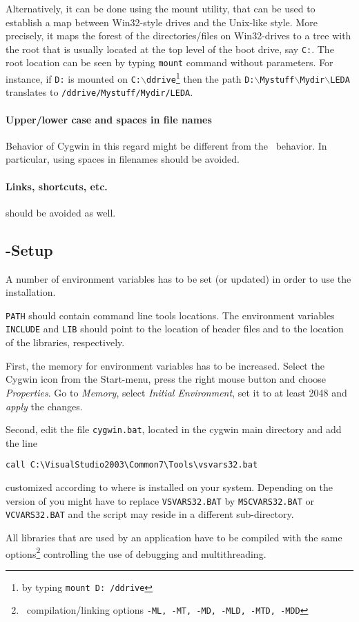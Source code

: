 Alternatively, it can be done using the mount utility, that can be
used to establish a map between Win32-style drives and the Unix-like
style. More precisely, it maps the forest of the directories/files on
Win32-drives to a tree with the root that is usually located at the top
level of the boot drive, say \texttt{C:}.  The root location can be
seen by typing \texttt{mount} command without parameters.  For
instance, if \texttt{D:} is mounted on
\texttt{C:$\backslash$ddrive}\footnote{by typing \texttt{mount D:
    /ddrive}} then the path
\texttt{D:$\backslash$Mystuff$\backslash$Mydir$\backslash$LEDA}
translates to \texttt{/ddrive/Mystuff/Mydir/LEDA}.

\paragraph{Upper/lower case and spaces in file names}
Behavior of Cygwin in this regard might be different from the \mswin\
behavior. In particular, using spaces in filenames should be avoided.

\paragraph{Links, shortcuts, etc.} should be avoided as well.

\subsection{\msvc{}-Setup}

A number of environment variables has to be set (or updated)
in order to use the installation.

\texttt{PATH} should contain \msvc{} command line tools locations.
The environment variables \texttt{INCLUDE} and \texttt{LIB} should
point to the location of \msvc{} header files and to the location of
the \msvc{} libraries, respectively.

First, the memory for environment variables has to be increased.
Select the Cygwin icon from the Start-menu, press the right mouse
button and choose \textit{Properties}. Go to \textit{Memory}, select
\textit{Initial Environment}, set it to at least 2048 and
\textit{apply} the changes.

Second, edit the file \texttt{cygwin.bat}, located in the cygwin main
directory and add the line
\begin{verbatim}
call C:\VisualStudio2003\Common7\Tools\vsvars32.bat
\end{verbatim}
customized according to where \msvc{} is installed on your system.
Depending on the version of \msvc{} you might have to replace
\texttt{VSVARS32.BAT} by \texttt{MSCVARS32.BAT} or
\texttt{VCVARS32.BAT} and the script may reside in a different
sub-directory.

All libraries that are used by an application have to be compiled with
the same options\footnote{\msvc\ compilation/linking options
  \texttt{-ML, -MT, -MD, -MLD, -MTD, -MDD}} controlling the use of
debugging and multithreading.



